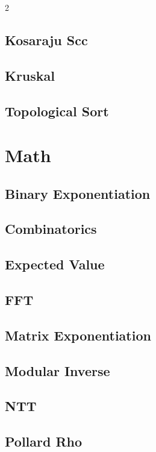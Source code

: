 \documentclass[a4paper,landscape,10pt]{article}
\begin{document}
\begin{multicols*}{2}
\subsection{Kosaraju Scc}

\subsection{Kruskal}

\subsection{Topological Sort}

\section{Math}
\subsection{Binary Exponentiation}

\subsection{Combinatorics}

\subsection{Expected Value}

\subsection{FFT}

\subsection{Matrix Exponentiation}

\subsection{Modular Inverse}

\subsection{NTT}

\subsection{Pollard Rho}


\end{multicols*}
\end{document}
